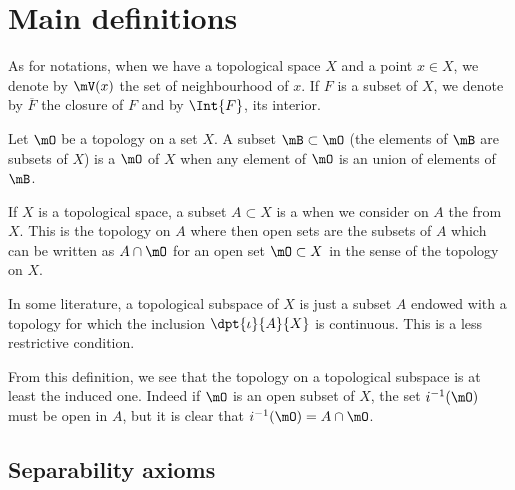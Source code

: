 
\section{Main definitions}

As for notations, when we have a topological space $X$ and a point $x\in X$, we denote by $\mV(x)$ the set of neighbourhood of $x$. If $F$ is a subset of $X$, we denote by $\overline{F}$ the closure of $F$ and by $\Int{F}$, its interior.

\begin{definition}
Let $\mO$ be a topology on a set $X$. A subset $\mB\subset\mO$ (the elements of $\mB$ are subsets of $X$) is a  $\mO$ of $X$ when
any element of $\mO$ is an union of elements of $\mB$.
\end{definition}

\begin{definition}
If $X$ is a topological space, a subset $A\subset X$ is a  when we consider on $A$ the  from $X$. This is the topology on $A$ where then open sets are the subsets of $A$ which can be written as $A\cap\mO$ for an open set $\mO\subset X$ in the sense of the topology on $X$.
\end{definition}

\begin{remark}
In some literature, a topological subspace of $X$ is just a subset $A$ endowed with a topology for which the inclusion $\dpt{\iota}{A}{X}$ is continuous. This is a less restrictive condition.
\end{remark}

From this definition, we see that the topology on a topological subspace is at least the induced one. Indeed if $\mO$ is an open subset of $X$, the set $i^{-1}(\mO)$ must be open in $A$, but it is clear that $i^{-1}(\mO)=A\cap \mO$.

					\subsection{Separability axioms}	

